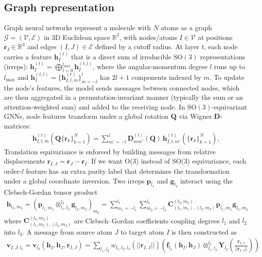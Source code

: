 \documentclass[pdflatex,sn-mathphys-num]{sn-jnl}%
\begin{document}
\subsection{Graph representation}
Graph neural networks represent a molecule with $N$ atoms as a graph $\mathcal{G}=(\mathcal{V},\mathcal{E})$ in 3D Euclidean space $\mathbb{R}^3$, with nodes/atoms $I\in\mathcal{V}$ at positions $\mathbf{r}_I\in\mathbb{R}^3$ and edges $(I,J)\in\mathcal{E}$ defined by a cutoff radius. At layer $t$, each node carries a feature $\mathbf{h}_I^{(t)}$ that is a direct sum of irreducible $\mathrm{SO}(3)$ representations (irreps): $\mathbf{h}_I^{(t)}=\bigoplus_{l=0}^{l_{\max}}\mathbf{h}_{I}^{(t,l)}$, where the angular-momentum degree $l$ runs up to $l_{\max}$ and $\mathbf{h}_{I}^{(t,l)}=\{\mathbf{h}^{(t)}_{I,l,m}\}_{m=-l}^{l}$ has $2l+1$ components indexed by $m$. To update the node's features, the model sends messages between connected nodes, which are then aggregated in a permutation-invariant manner (typically the sum or an attention-weighted sum) and added to the receiving node.
In $\mathrm{SO}(3)$-equivariant GNNs, node features transform under a global rotation $\mathbf{Q}$ via Wigner $\mathbf{D}$-matrices:
\begin{align}
\mathbf{h}^{(t)}_{I,l,m}\!\left(\mathbf{Q}\{\mathbf{r}_k\}_{k=1}^N\right)
= \sum_{m'=-l}^{l} \mathbf{D}^{(l)}_{m m'}(\mathbf{Q})\,\mathbf{h}^{(t)}_{I,l,m'}\!\left(\{\mathbf{r}_k\}_{k=1}^N\right),
\label{eq:so3-transform}
\end{align}
Translation equivariance is enforced by building messages from relative displacements $\mathbf{r}_{I,J}=\mathbf{r}_J-\mathbf{r}_I$. If we want O(3) instead of SO(3) equivariance, each order-$l$ feature has an extra parity label that determines the transformation under a global coordinate inversion.
%
Two irreps $\mathbf{p}_{l_1}$ and $\mathbf{g}_{l_2}$ interact using the Clebsch-Gordan tensor product \citep{thomas2018}
\begin{align}
    \mathbf{h}_{l_3,m_3} = \left( \mathbf{p}_{l_1,m_1} \otimes_{l_1, l_2}^{l_3} \mathbf{g}_{l_2,m_2} \right)_{m_3} = \sum_{m_1 = -l_1}^{l_1} \sum_{m_2 = -l_2}^{l_2} \mathbf{C}_{(l_1,m_1),(l_2,m_2)}^{(l_3,m_3)} \mathbf{p}_{l_1,m_1} \mathbf{g}_{l_2,m_2} \label{eq:tp}
\end{align}
where $\mathbf{C}_{(l_1,m_1),(l_2,m_2)}^{(l_3,m_3)}$ are Clebsch--Gordan coefficients coupling degrees $l_1$ and $l_2$ into $l_3$.
A message from source atom $J$ to target atom $I$ is then constructed as
\begin{align}
    \mathbf{v}_{I,J, l_3} = \mathbf{v}_{l_3}(\mathbf{h}_I, \mathbf{h}_J, \mathbf{r}_{I,J}) = \sum_{l_1, l_2} w_{l_1, l_2, l_3}(||\mathbf{r}_{I,J}||) \left( \mathbf{f}_{l_1}(\mathbf{h}_{I},\mathbf{h}_{J}) \otimes_{l_1, l_2}^{l_3} \mathbf{Y}_{l_2}\left(\frac{\mathbf{r}_{I,J}}{||\mathbf{r}_{I,J}||}\right) \right) \label{eq:mp}
\end{align}
\end{document}
